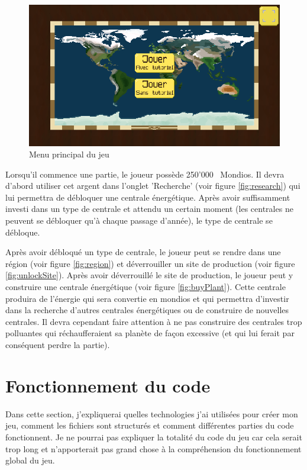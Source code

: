 \documentclass{article}
\newcommand{\initMoney}{250'000}
\begin{document}
        \begin{figure}[H]
                \includegraphics[width=\linewidth]{../images/mainMenu}
                \caption{Menu principal du jeu}
                \label{fig:mainMenu}
        \end{figure}
        
        Lorsqu'il commence une partie, le joueur possède \initMoney ~ Mondios. Il devra d'abord utiliser cet argent dans l'onglet 'Recherche' (voir figure \ref{fig:research}) qui lui permettra de débloquer une centrale énergétique. Après avoir suffisamment investi dans un type de centrale et attendu un certain moment (les centrales ne peuvent se débloquer qu'à chaque passage d'année), le type de centrale se débloque.
        
        
        Après avoir débloqué un type de centrale, le joueur peut se rendre dans une région (voir figure \ref{fig:region}) et déverrouiller un site de production (voir figure \ref{fig:unlockSite}). Après avoir déverrouillé le site de production, le joueur peut y construire une centrale énergétique (voir figure \ref{fig:buyPlant}). Cette centrale produira de l'énergie qui sera convertie en mondios et qui permettra d'investir dans la recherche d'autres centrales énergétiques ou de construire de nouvelles centrales. Il devra cependant faire attention à ne pas construire des centrales trop polluantes qui réchaufferaient sa planète de façon excessive (et qui lui ferait par conséquent perdre la partie).
        

        \section{Fonctionnement du code}
        Dans cette section, j'expliquerai quelles technologies j'ai utilisées pour créer mon jeu, comment les fichiers sont structurés et comment différentes parties du code fonctionnent. Je ne pourrai pas expliquer la totalité du code du jeu car cela serait trop long et n'apporterait pas grand chose à la compréhension du fonctionnement global du jeu. 
        
\end{document}
